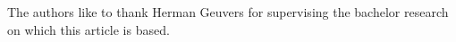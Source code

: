 The authors like to thank Herman Geuvers for supervising the bachelor research on which this article is based.